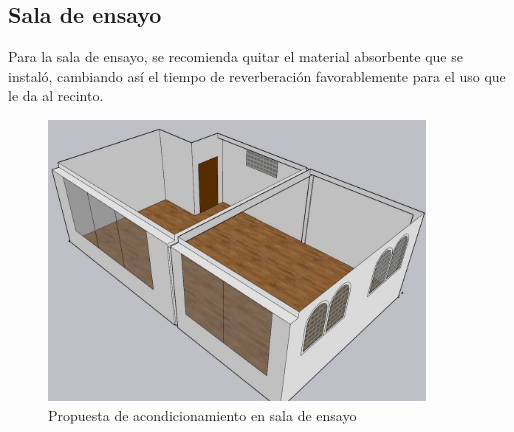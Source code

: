 \subsection{Sala de ensayo}
Para la sala de ensayo, se recomienda quitar el material absorbente que se instaló, cambiando así el tiempo de reverberación favorablemente para el uso que le da al recinto.
\begin{figure}[H]
    \centering
    \includegraphics[width=10cm]{Imagenes/Propuesta/Sala ensayo sin paneles.jpg}
    \caption{Propuesta de acondicionamiento en sala de ensayo}
    \label{fig:propuesta_ensayo}
\end{figure}